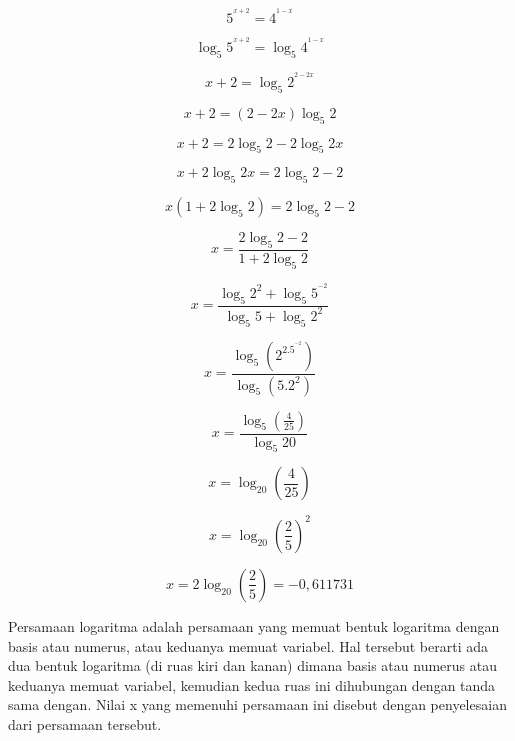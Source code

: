 \begin{eulernotebook}
\begin{eulercomment}
\begin{eulercomment}
\begin{eulercomment}
\end{eulercomment}
\begin{eulerformula}
\[
5^{^{x+2}} = 4^{^{1-x}}
\]
\end{eulerformula}
\begin{eulerformula}
\[
\log_{5} 5^{^{x+2}} = \log_{5} 4^{^{1-x}}
\]
\end{eulerformula}
\begin{eulerformula}
\[
x+2 = \log_{5} 2^{^{2-2x}}
\]
\end{eulerformula}
\begin{eulerformula}
\[
x+2 = (2-2x) \log_{5} 2
\]
\end{eulerformula}
\begin{eulerformula}
\[
x+2 = 2\log_{5}2 - 2\log_{5}2 x
\]
\end{eulerformula}
\begin{eulerformula}
\[
x+2\log_{5}2 x = 2\log_{5}2 -2
\]
\end{eulerformula}
\begin{eulerformula}
\[
x(1+2\log_{5}2) = 2\log_{5}2 -2
\]
\end{eulerformula}
\begin{eulerformula}
\[
x = \frac{2\log_{5}2 -2}{1+2\log_{5}2}
\]
\end{eulerformula}
\begin{eulerformula}
\[
x = \frac{\log_{5}2^2 +\log_{5}5^{^{-2}}}{\log_{5}5+\log_{5}2^2}
\]
\end{eulerformula}
\begin{eulerformula}
\[
x = \frac{\log_{5}(2^2.5^{^{-2}})}{\log_{5}(5.2^2)}
\]
\end{eulerformula}
\begin{eulerformula}
\[
x = \frac{\log_{5}(\frac{4}{25})}{\log_{5}20}
\]
\end{eulerformula}
\begin{eulerformula}
\[
x = \log_{20}(\frac{4}{25})
\]
\end{eulerformula}
\begin{eulerformula}
\[
x = \log_{20}(\frac{2}{5})^2
\]
\end{eulerformula}
\begin{eulerformula}
\[
x = 2\log_{20}(\frac{2}{5}) = -0,611731
\]
\end{eulerformula}
\begin{eulercomment}
Persamaan logaritma adalah persamaan yang memuat bentuk logaritma
dengan basis atau numerus, atau keduanya memuat variabel. Hal tersebut
berarti ada dua bentuk logaritma (di ruas kiri dan kanan) dimana basis
atau numerus atau keduanya memuat variabel, kemudian kedua ruas ini
dihubungan dengan tanda sama dengan. Nilai x yang memenuhi persamaan
ini disebut dengan penyelesaian dari persamaan tersebut.


\end{eulercomment}
\end{eulercomment}
\end{eulercomment}
\end{eulernotebook}
